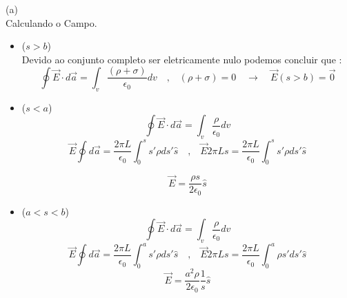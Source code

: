 \documentclass[a4paper,11pt]{exam}
\begin{document}
{\begin{center}
	\end{center}
	(a) \\
	\indent Calculando o Campo.
	\begin{itemize}
	\item ($s > b$) \\
		Devido ao conjunto completo ser eletricamente nulo podemos concluir que :
		\[\oint \vec{E} \cdot d\vec{a} = \int_v \frac{(\rho + \sigma)}{\epsilon_0} dv \quad \text{,} \quad (\rho + \sigma) = 0 \quad \to \quad \vec{E}(s>b) = \vec{0}\]
	\item ($s < a$)
		\[\oint \vec{E} \cdot d\vec{a} = \int_v \frac{\rho}{\epsilon_0} dv\]
		\[ \vec{E} \oint d\vec{a} = \frac{2 \pi L}{\epsilon_0} \int_0^s  s' \rho ds' \hat{s} \quad \text{,} \quad \vec{E} 2\pi L s= \frac{2 \pi L}{\epsilon_0} \int_0^s  s' \rho ds' \hat{s}\]
		
		\[\vec{E} = \frac{\rho s}{2\epsilon_0}\hat{s}\]
		
	\item ($a < s < b$)
		\[\oint \vec{E} \cdot d\vec{a} = \int_v \frac{\rho}{\epsilon_0} dv\]
		\[ \vec{E} \oint d\vec{a} = \frac{2\pi L}{\epsilon_0} \int_0^a s'\rho ds' \hat{s} \quad \text{,} \quad \vec{E} 2\pi L s = \frac{2\pi L}{\epsilon_0} \int_0^a \rho s'ds' \hat{s}\]
		\[\vec{E} = \frac{a^2 \rho}{2\epsilon_0}\frac{1}{s} \hat{s}\]

	\end{itemize}
	
}
\end{document}
